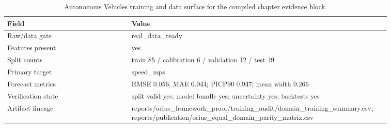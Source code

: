 \begin{table}[htbp]
\centering
\small
\caption{Autonomous Vehicles training and data surface for the compiled chapter evidence block.}
\label{tab:av-training-surface}
\begin{tabular}{p{0.31\linewidth}p{0.61\linewidth}}
\toprule
\textbf{Field} & \textbf{Value}\\
\midrule
Raw/data gate & real\_data\_ready\\
Features present & yes\\
Split counts & train 85 / calibration 6 / validation 12 / test 19\\
Primary target & speed\_mps\\
Forecast metrics & RMSE 0.056; MAE 0.044; PICP90 0.947; mean width 0.266\\
Verification state & split valid yes; model bundle yes; uncertainty yes; backtests yes\\
Artifact lineage & reports/orius\_framework\_proof/training\_audit/domain\_training\_summary.csv; reports/publication/orius\_equal\_domain\_parity\_matrix.csv\\
\bottomrule
\end{tabular}
\end{table}
